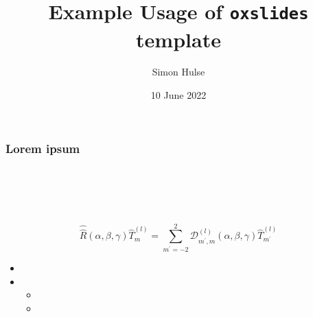 \documentclass[mfbranding]{oxslides}
\title[\texttt{oxslides Example}]{Example Usage of \texttt{oxslides} template}
\author{Simon Hulse}
\date[10/6/22]{10 June 2022}
\begin{document}
\begin{frame}
  \titlepage
\end{frame}

\begin{frame}
    \frametitle{Lorem ipsum}
    \framesubtitle{\lipsum[1][2]}
    \lipsum[1][3]\\
    \textbf{\lipsum[1][4]}\\
    \textit{\lipsum[1][5]}\\
    \texttt{\lipsum[1][6]}\\
    \[ \hat{\hat{R}} (\alpha, \beta, \gamma) \hat{T}_m^{(l)} = \sum_{m^{\prime} = -2}^2 \mathcal{D}_{m^{\prime}, m}^{(l)} (\alpha, \beta, \gamma) \hat{T}_{m^{\prime}}^{(l)} \]
    \begin{itemize}
        \item \lipsum[1][7]
        \item \lipsum[1][8]
        \begin{itemize}
            \item \lipsum[1][9]
            \item \lipsum[1][10]
        \end{itemize}
    \end{itemize}
\end{frame}
\end{document}
